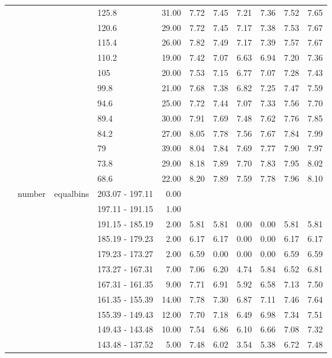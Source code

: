 \begin{longtable}{llllrrrrrrr}
   &  &  & 125.8 & 31.00 & 7.72 & 7.45 & 7.21 & 7.36 & 7.52 & 7.65 \\ 
   &  &  & 120.6 & 29.00 & 7.72 & 7.45 & 7.17 & 7.38 & 7.53 & 7.67 \\ 
   &  &  & 115.4 & 26.00 & 7.82 & 7.49 & 7.17 & 7.39 & 7.57 & 7.67 \\ 
   &  &  & 110.2 & 19.00 & 7.42 & 7.07 & 6.63 & 6.94 & 7.20 & 7.36 \\ 
   &  &  & 105 & 20.00 & 7.53 & 7.15 & 6.77 & 7.07 & 7.28 & 7.43 \\ 
   &  &  & 99.8 & 21.00 & 7.68 & 7.38 & 6.82 & 7.25 & 7.47 & 7.59 \\ 
   &  &  & 94.6 & 25.00 & 7.72 & 7.44 & 7.07 & 7.33 & 7.56 & 7.70 \\ 
   &  &  & 89.4 & 30.00 & 7.91 & 7.69 & 7.48 & 7.62 & 7.76 & 7.85 \\ 
   &  &  & 84.2 & 27.00 & 8.05 & 7.78 & 7.56 & 7.67 & 7.84 & 7.99 \\ 
   &  &  & 79 & 39.00 & 8.04 & 7.84 & 7.69 & 7.77 & 7.90 & 7.97 \\ 
   &  &  & 73.8 & 29.00 & 8.18 & 7.89 & 7.70 & 7.83 & 7.95 & 8.02 \\ 
   &  &  & 68.6 & 22.00 & 8.20 & 7.89 & 7.59 & 7.78 & 7.96 & 8.10 \\ 
   & number & equalbins & 203.07 - 197.11 & 0.00 &  &  &  &  &  &  \\ 
   &  &  & 197.11 - 191.15 & 1.00 &  &  &  &  &  &  \\ 
   &  &  & 191.15 - 185.19 & 2.00 & 5.81 & 5.81 & 0.00 & 0.00 & 5.81 & 5.81 \\ 
   &  &  & 185.19 - 179.23 & 2.00 & 6.17 & 6.17 & 0.00 & 0.00 & 6.17 & 6.17 \\ 
   &  &  & 179.23 - 173.27 & 2.00 & 6.59 & 0.00 & 0.00 & 0.00 & 6.59 & 6.59 \\ 
   &  &  & 173.27 - 167.31 & 7.00 & 7.06 & 6.20 & 4.74 & 5.84 & 6.52 & 6.81 \\ 
   &  &  & 167.31 - 161.35 & 9.00 & 7.71 & 6.91 & 5.92 & 6.58 & 7.13 & 7.50 \\ 
   &  &  & 161.35 - 155.39 & 14.00 & 7.78 & 7.30 & 6.87 & 7.11 & 7.46 & 7.64 \\ 
   &  &  & 155.39 - 149.43 & 12.00 & 7.70 & 7.18 & 6.49 & 6.98 & 7.34 & 7.51 \\ 
   &  &  & 149.43 - 143.48 & 10.00 & 7.54 & 6.86 & 6.10 & 6.66 & 7.08 & 7.32 \\ 
   &  &  & 143.48 - 137.52 & 5.00 & 7.48 & 6.02 & 3.54 & 5.38 & 6.72 & 7.48 \\ 

\end{longtable}
